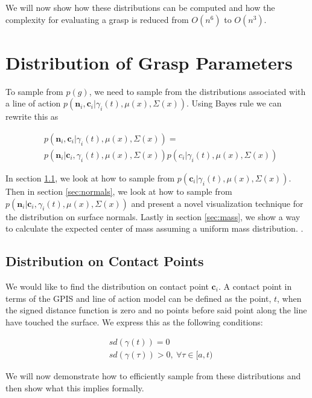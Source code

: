 \documentclass[letterpaper, 10 pt, conference]{ieeeconf}  %
\begin{document}
We will now show how these distributions can be computed and how the complexity for evaluating a grasp is reduced from $O(n^6)$ to $O(n^3)$. 


\section{Distribution of Grasp Parameters}
\label{sec:distgrasp}
 
 To sample from $p(g)$, we need to sample from the distributions associated with a line of action $p(\textbf{n}_i,\textbf{c}_i|\gamma_i(t),\mu(x),\Sigma(x))$. Using Bayes rule we can rewrite this as 
 
 \vspace{-2ex}
 \begin{align*}
 &p(\textbf{n}_i,\textbf{c}_i|\gamma_i(t),\mu(x),\Sigma(x))=\\
 &p(\textbf{n}_i|\textbf{c}_i,\gamma_i(t),\mu(x),\Sigma(x))p(c_i|\gamma_i(t),\mu(x),\Sigma(x))
 \end{align*}
 
 In section \ref{sec:contact}, we look at how to sample from $p(\textbf{c}_i|\gamma_i(t),\mu(x),\Sigma(x))$. Then in section \ref{sec:normals}, we look at how to sample from $p(\textbf{n}_i|\textbf{c}_i,\gamma_i(t),\mu(x),\Sigma(x))$ and present a novel visualization technique for the distribution on surface normals. Lastly in section \ref{sec:mass}, we show a way to calculate the expected center of mass assuming a uniform mass distribution. 
 .
\subsection{Distribution on Contact Points}\label{sec:contact} 
We would like to find the distribution on contact point $\textbf{c}_i$. A contact point in terms of the GPIS and line of action model can be defined as the point, $t$, when the signed distance function is zero and no points before said point along the line have touched the surface. We express this as the following conditions: 

\vspace{-2ex}
\begin{align}
 &sd(\gamma(t)) = 0 \label{eq:density_cond} \\
&sd(\gamma(\tau)) > 0, \: \forall \tau \in [a,t) \label{eq:cdf_cond}
\end{align}

We will now demonstrate how to efficiently sample from these distributions and then show what this implies formally. 
\end{document}
